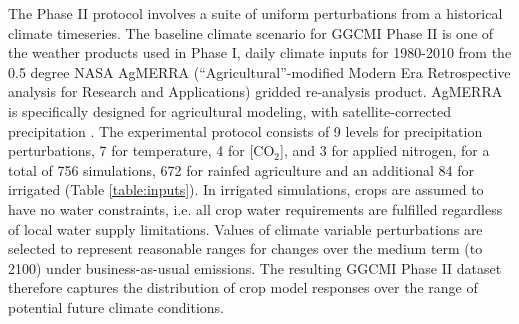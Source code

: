 \documentclass[gmd, manuscript]{copernicus} %
\begin{document}
The Phase II protocol involves a suite of uniform perturbations from a historical climate timeseries.
The baseline climate scenario for GGCMI Phase II is one of the weather products used in Phase I, daily climate inputs for 1980-2010 from the 0.5 degree NASA AgMERRA (``Agricultural''-modified Modern Era Retrospective analysis for Research and Applications) gridded re-analysis product. AgMERRA is specifically designed for agricultural modeling, with satellite-corrected precipitation \citep{Ruane2015}. 
The experimental protocol consists of 9 levels for precipitation perturbations, 7 for temperature, 4 for [CO$_2$], and 3 for applied nitrogen, for a total of 756 simulations, 672 for rainfed agriculture and an additional 84 for irrigated (Table \ref{table:inputs}). 
In irrigated simulations, crops are assumed to have no water constraints, i.e. all crop water requirements are fulfilled regardless of local water supply limitations.
Values of climate variable perturbations are selected to represent reasonable ranges for changes over the medium term (to 2100) under business-as-usual emissions. 
The resulting GGCMI Phase II dataset therefore captures the distribution of crop model responses over the range of potential future climate conditions.
\end{document}
